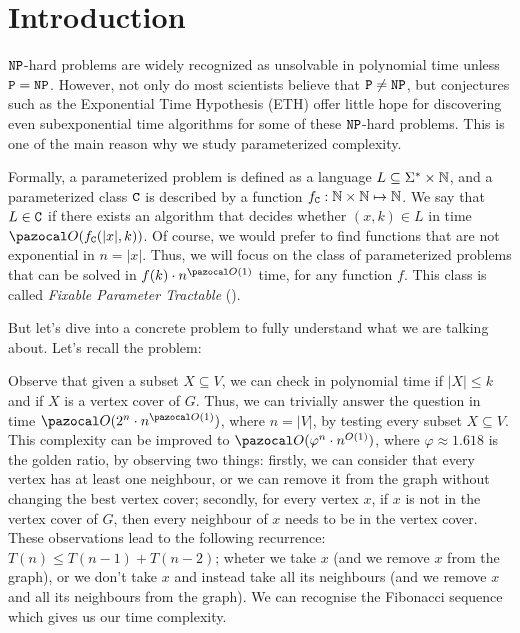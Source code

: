\section{Introduction}
\label{section:introduction}

$\texttt{NP}$-hard problems are widely recognized as unsolvable in polynomial time unless $\texttt{P} = \texttt{NP}$. However, not only do most scientists believe that $\texttt{P} \neq \texttt{NP}$, but conjectures such as the Exponential Time Hypothesis (ETH) \cite{impagliazzo2001complexity} offer little hope for discovering even subexponential time algorithms for some of these $\texttt{NP}$-hard problems. This is one of the main reason why we study parameterized complexity.

Formally, a parameterized problem is defined as a language $L \subseteq \Sigma^* \times \mathbb{N}$, and a parameterized class $\texttt{C}$ is described by a function $f_{\texttt{C}} : \mathbb{N} \times \mathbb{N} \mapsto \mathbb{N}$. We say that $L \in \texttt{C}$ if there exists an algorithm that decides whether $(x, k) \in L$ in time $\O(f_{\CC{C}}(|x|, k))$. Of course, we would prefer to find functions that are not exponential in $n = |x|$. Thus, we will focus on the class of parameterized problems that can be solved in $f(k)\cdot n^{\O(1)}$ time, for any function $f$. This class is called \textit{Fixable Parameter Tractable} ().

\medskip

But let's dive into a concrete problem to fully understand what we are talking about. Let's recall the  problem:

\begin{problem}
\end{problem}

Observe that given a subset $X \subseteq V$, we can check in polynomial time if $|X| \leq k$ and if $X$ is a vertex cover of $G$. Thus, we can trivially answer the question in time $\O(2^n \cdot n^{\O(1)})$, where $n = |V|$, by testing every subset $X \subseteq V$. This complexity can be improved to $\O(\varphi^n \cdot n^{O(1)})$, where $\varphi \approx 1.618$ is the golden ratio, by observing two things: firstly, we can consider that every vertex has at least one neighbour, or we can remove it from the graph without changing the best vertex cover; secondly, for every vertex $x$, if $x$ is not in the vertex cover of $G$, then every neighbour of $x$ needs to be in the vertex cover. These observations lead to the following recurrence: $T(n) \leq T(n - 1) + T(n - 2)$; wheter we take $x$ (and we remove $x$ from the graph), or we don't take $x$ and instead take all its neighbours (and we remove $x$ and all its neighbours from the graph). We can recognise the Fibonacci sequence which gives us our time complexity.

